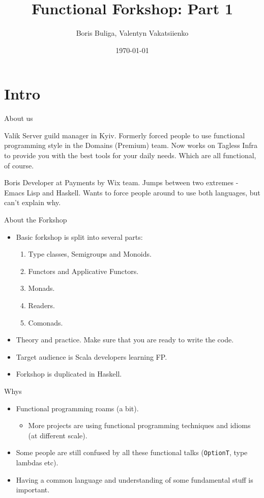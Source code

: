 \documentclass[presentation,aspectratio=169,smaller]{beamer}
\author{Boris Buliga, Valentyn Vakatsiienko}
\date{\today}
\title{Functional Forkshop: Part 1}
\begin{document}
\maketitle

\section*{Intro}
\label{sec:org8344750}

\begin{frame}[label={sec:org4c212c7}]{About us}
\begin{block}{Valik}
Server guild manager in Kyiv. Formerly forced people to use functional
programming style in the Domains (Premium) team. Now works on Tagless Infra to
provide you with the best tools for your daily needs. Which are all functional,
of course.

\pause
\end{block}

\begin{block}{Boris}
Developer at Payments by Wix team. Jumps between two extremes - Emacs Lisp and
Haskell. Wants to force people around to use both languages, but can't explain
why.
\end{block}
\end{frame}

\begin{frame}[label={sec:org7f69e6a}]{About the Forkshop}
\begin{itemize}
\item Basic forkshop is split into several parts:
\begin{enumerate}
\item Type classes, Semigroups and Monoids.
\item Functors and Applicative Functors.
\item Monads.
\item Readers.
\item Comonads.
\end{enumerate}
\item Theory and practice. Make sure that you are ready to write the code.
\item Target audience is Scala developers learning FP.
\item Forkshop is duplicated in Haskell.
\end{itemize}
\end{frame}

\begin{frame}[label={sec:orgfc31248},fragile]{Whys}
 \begin{itemize}
\item Functional programming roams (a bit).
\begin{itemize}
\item More projects are using functional programming techniques and idioms (at
different scale).
\end{itemize}
\item Some people are still confused by all these functional talks (\texttt{OptionT}, type
lambdas etc).
\item Having a common language and understanding of some fundamental stuff is
important.
\end{itemize}
\end{frame}
\end{document}
